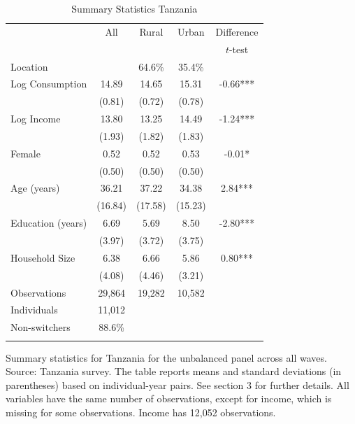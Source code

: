 \begin{table}[h!] \centering \caption{Summary Statistics Tanzania}\label{tab:summary_stats_TZA_unb} \begin{threeparttable} \begin{tabular}{l cccc} \toprule
& All & Rural & Urban & Difference \\
 &  &  &  & $t$-test \\
\midrule
Location &  &   64.6\% &   35.4\% &  \\  \addlinespace \addlinespace
Log Consumption & 14.89 & 14.65 & 15.31 & -0.66*** \\
 & (0.81) & (0.72) & (0.78) &  \\  \addlinespace
Log Income & 13.80 & 13.25 & 14.49 & -1.24*** \\
 & (1.93) & (1.82) & (1.83) &  \\  \addlinespace
Female & 0.52 & 0.52 & 0.53 & -0.01* \\
 & (0.50) & (0.50) & (0.50) &  \\  \addlinespace
Age (years) & 36.21 & 37.22 & 34.38 & 2.84*** \\
 & (16.84) & (17.58) & (15.23) &  \\  \addlinespace
Education (years) & 6.69 & 5.69 & 8.50 & -2.80*** \\
 & (3.97) & (3.72) & (3.75) &  \\  \addlinespace
Household Size & 6.38 & 6.66 & 5.86 & 0.80*** \\
 & (4.08) & (4.46) & (3.21) &  \\  \addlinespace


\cmidrule{2-5}
Observations & 29,864 & 19,282 & 10,582 &  \\  
Individuals & 11,012 &  &  &  \\
Non-switchers &   88.6\% &  &  &  \\  \addlinespace
\bottomrule \end{tabular} \begin{tablenotes}[flushleft] \footnotesize \item{Summary statistics for Tanzania for the unbalanced panel across all waves. Source: Tanzania survey. The table reports means and standard deviations (in parentheses) based on individual-year pairs. See section 3 for further details. All variables have the same number of observations, except for income, which is missing for some observations. Income has 12,052 observations.} \end{tablenotes} \end{threeparttable} \end{table}